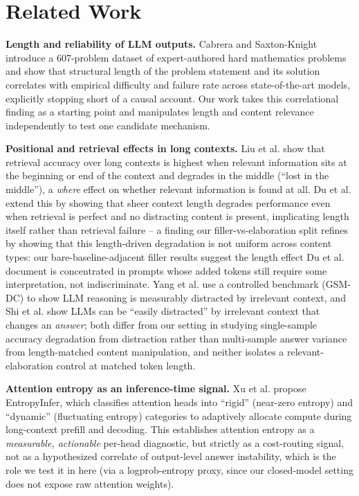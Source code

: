 \documentclass[11pt,letterpaper]{article}
\begin{document}
\section{Related Work}

\textbf{Length and reliability of LLM outputs.} Cabrera and Saxton-Knight \citep{Cabrera2026} introduce a 607-problem dataset of expert-authored hard mathematics problems and show that structural length of the problem statement and its solution correlates with empirical difficulty and failure rate across state-of-the-art models, explicitly stopping short of a causal account. Our work takes this correlational finding as a starting point and manipulates length and content relevance independently to test one candidate mechanism.

\textbf{Positional and retrieval effects in long contexts.} Liu et al. \citep{Liu2023} show that retrieval accuracy over long contexts is highest when relevant information sits at the beginning or end of the context and degrades in the middle (``lost in the middle''), a \emph{where} effect on whether relevant information is found at all. Du et al. \citep{Du2025} extend this by showing that sheer context length degrades performance even when retrieval is perfect and no distracting content is present, implicating length itself rather than retrieval failure -- a finding our filler-vs-elaboration split refines by showing that this length-driven degradation is not uniform across content types: our bare-baseline-adjacent filler results suggest the length effect Du et al. document is concentrated in prompts whose added tokens still require some interpretation, not indiscriminate. Yang et al. \citep{Yang2025} use a controlled benchmark (GSM-DC) to show LLM reasoning is measurably distracted by irrelevant context, and Shi et al. \citep{Shi2023} show LLMs can be ``easily distracted'' by irrelevant context that changes an \emph{answer}; both differ from our setting in studying single-sample accuracy degradation from distraction rather than multi-sample answer variance from length-matched content manipulation, and neither isolates a relevant-elaboration control at matched token length.

\textbf{Attention entropy as an inference-time signal.} Xu et al. \citep{Xu2026} propose EntropyInfer, which classifies attention heads into ``rigid'' (near-zero entropy) and ``dynamic'' (fluctuating entropy) categories to adaptively allocate compute during long-context prefill and decoding. This establishes attention entropy as a \emph{measurable, actionable} per-head diagnostic, but strictly as a cost-routing signal, not as a hypothesized correlate of output-level answer instability, which is the role we test it in here (via a logprob-entropy proxy, since our closed-model setting does not expose raw attention weights).
\end{document}
